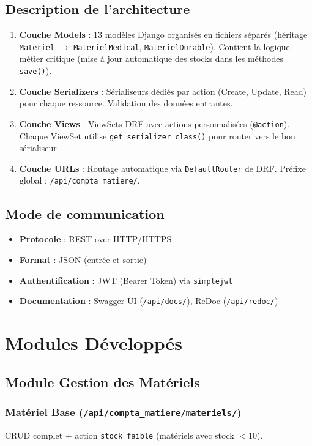 \documentclass[12pt,a4paper]{report}
\begin{document}
\section{Description de l'architecture}
\begin{enumerate}
    \item \textbf{Couche Models} : 13 modèles Django organisés en fichiers séparés (héritage \texttt{Materiel} $\rightarrow$ \texttt{MaterielMedical}, \texttt{MaterielDurable}). Contient la logique métier critique (mise à jour automatique des stocks dans les méthodes \texttt{save()}).
    \item \textbf{Couche Serializers} : Sérialiseurs dédiés par action (Create, Update, Read) pour chaque ressource. Validation des données entrantes.
    \item \textbf{Couche Views} : ViewSets DRF avec actions personnalisées (\texttt{@action}). Chaque ViewSet utilise \texttt{get\_serializer\_class()} pour router vers le bon sérialiseur.
    \item \textbf{Couche URLs} : Routage automatique via \texttt{DefaultRouter} de DRF. Préfixe global : \texttt{/api/compta\_matiere/}.
\end{enumerate}

\section{Mode de communication}
\begin{itemize}
    \item \textbf{Protocole} : REST over HTTP/HTTPS
    \item \textbf{Format} : JSON (entrée et sortie)
    \item \textbf{Authentification} : JWT (Bearer Token) via \texttt{simplejwt}
    \item \textbf{Documentation} : Swagger UI (\texttt{/api/docs/}), ReDoc (\texttt{/api/redoc/})
\end{itemize}

\chapter{Modules Développés}

\section{Module Gestion des Matériels}
\subsection{Matériel Base (\texttt{/api/compta\_matiere/materiels/})}
CRUD complet + action \texttt{stock\_faible} (matériels avec stock $< 10$).
\end{document}
